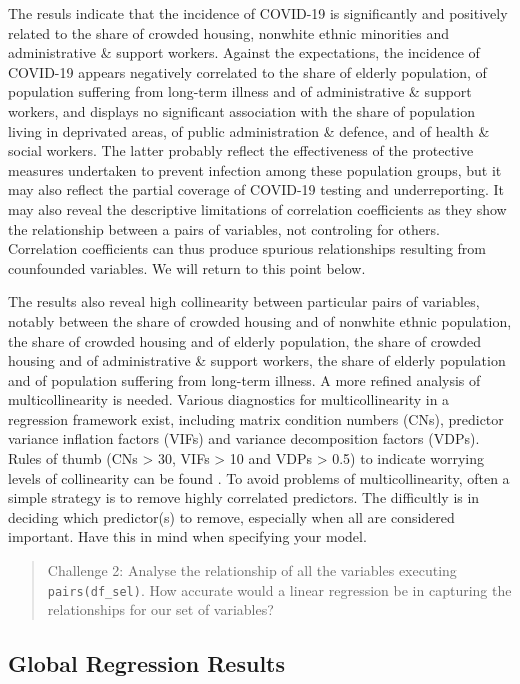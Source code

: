 \documentclass[]{book}
\begin{document}
The resuls indicate that the incidence of COVID-19 is significantly and
positively related to the share of crowded housing, nonwhite ethnic
minorities and administrative \& support workers. Against the
expectations, the incidence of COVID-19 appears negatively correlated to
the share of elderly population, of population suffering from long-term
illness and of administrative \& support workers, and displays no
significant association with the share of population living in
deprivated areas, of public administration \& defence, and of health \&
social workers. The latter probably reflect the effectiveness of the
protective measures undertaken to prevent infection among these
population groups, but it may also reflect the partial coverage of
COVID-19 testing and underreporting. It may also reveal the descriptive
limitations of correlation coefficients as they show the relationship
between a pairs of variables, not controling for others. Correlation
coefficients can thus produce spurious relationships resulting from
counfounded variables. We will return to this point below.

The results also reveal high collinearity between particular pairs of
variables, notably between the share of crowded housing and of nonwhite
ethnic population, the share of crowded housing and of elderly
population, the share of crowded housing and of administrative \&
support workers, the share of elderly population and of population
suffering from long-term illness. A more refined analysis of
multicollinearity is needed. Various diagnostics for multicollinearity
in a regression framework exist, including matrix condition numbers
(CNs), predictor variance inflation factors (VIFs) and variance
decomposition factors (VDPs). Rules of thumb (CNs \textgreater{} 30,
VIFs \textgreater{} 10 and VDPs \textgreater{} 0.5) to indicate worrying
levels of collinearity can be found \citep{belsley2005regression}. To
avoid problems of multicollinearity, often a simple strategy is to
remove highly correlated predictors. The difficultly is in deciding
which predictor(s) to remove, especially when all are considered
important. Have this in mind when specifying your model.

\begin{quote}
Challenge 2: Analyse the relationship of all the variables executing
\texttt{pairs(df\_sel)}. How accurate would a linear regression be in
capturing the relationships for our set of variables?
\end{quote}

\subsection{Global Regression Results}\label{global-regression-results}
\end{document}
